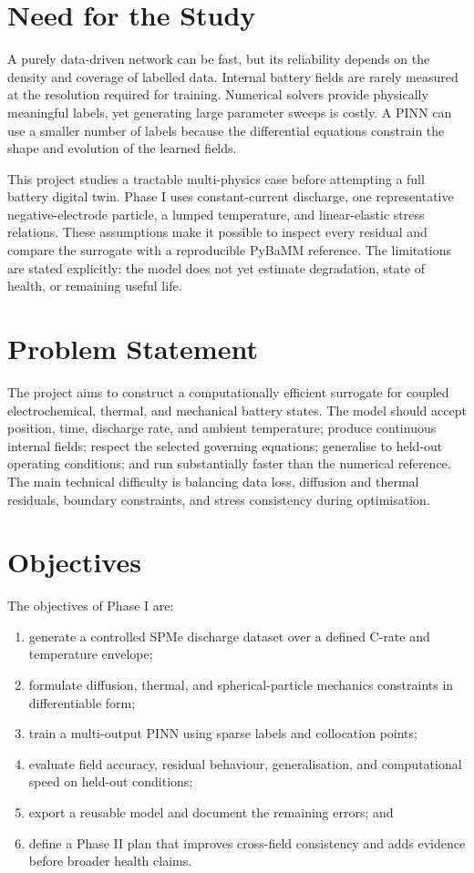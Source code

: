 \documentclass[14pt,a4paper,oneside]{extreport}
\begin{document}
\section{Need for the Study}
A purely data-driven network can be fast, but its reliability depends on the density and coverage of labelled data. Internal battery fields are rarely measured at the resolution required for training. Numerical solvers provide physically meaningful labels, yet generating large parameter sweeps is costly. A PINN can use a smaller number of labels because the differential equations constrain the shape and evolution of the learned fields.

This project studies a tractable multi-physics case before attempting a full battery digital twin. Phase I uses constant-current discharge, one representative negative-electrode particle, a lumped temperature, and linear-elastic stress relations. These assumptions make it possible to inspect every residual and compare the surrogate with a reproducible PyBaMM reference. The limitations are stated explicitly: the model does not yet estimate degradation, state of health, or remaining useful life.

\section{Problem Statement}
The project aims to construct a computationally efficient surrogate for coupled electrochemical, thermal, and mechanical battery states. The model should accept position, time, discharge rate, and ambient temperature; produce continuous internal fields; respect the selected governing equations; generalise to held-out operating conditions; and run substantially faster than the numerical reference. The main technical difficulty is balancing data loss, diffusion and thermal residuals, boundary constraints, and stress consistency during optimisation.

\section{Objectives}
The objectives of Phase I are:
\begin{enumerate}
\item generate a controlled SPMe discharge dataset over a defined C-rate and temperature envelope;
\item formulate diffusion, thermal, and spherical-particle mechanics constraints in differentiable form;
\item train a multi-output PINN using sparse labels and collocation points;
\item evaluate field accuracy, residual behaviour, generalisation, and computational speed on held-out conditions;
\item export a reusable model and document the remaining errors; and
\item define a Phase II plan that improves cross-field consistency and adds evidence before broader health claims.
\end{enumerate}
\end{document}
